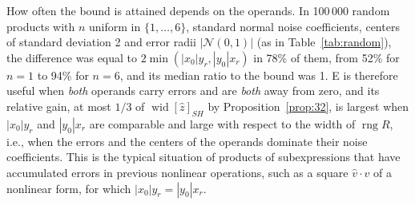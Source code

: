 \documentclass[11pt]{article}
\theoremstyle{definition}
\newcommand{\rng}{\operatorname{rng}}
\newcommand{\wid}{\operatorname{wid}}
\begin{document}
How often the bound is attained depends on the operands. In 100\,000 random products with $n$ uniform in $\{1,\dots,6\}$, standard normal noise coefficients, centers of standard deviation 2 and error radii $|\mathcal N(0,1)|$ (as in Table~\ref{tab:random}), the difference was equal to $2\min(|x_0|y_r,|y_0|x_r)$ in 78\% of them, from 52\% for $n=1$ to 94\% for $n=6$, and its median ratio to the bound was 1. E is therefore useful when \emph{both} operands carry errors and are \emph{both} away from zero, and its relative gain, at most $1/3$ of $\wid[\hat z]_{SH}$ by Proposition~\ref{prop:32}, is largest when $|x_0|y_r$ and $|y_0|x_r$ are comparable and large with respect to the width of $\rng R$, i.e., when the errors and the centers of the operands dominate their noise coefficients. This is the typical situation of products of subexpressions that have accumulated errors in previous nonlinear operations, such as a square $\hat v\cdot\hat v$ of a nonlinear form, for which $|x_0|y_r=|y_0|x_r$.
\end{document}
